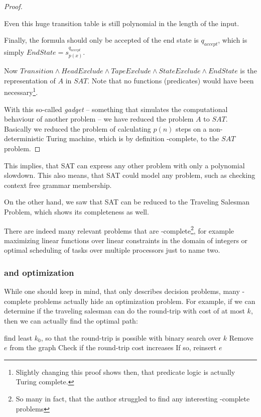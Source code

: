 \begin{proof}
\begin{itemize}
			Even this huge transition table is still polynomial in the length of the input.
	\end{itemize}
	
	Finally, the formula should only be accepted of the end state is $q_{accept}$, which is simply $EndState = s^{q_{accept}}_{p(x)}$.

	Now $Transition\wedge HeadExclude \wedge TapeExclude \wedge StateExclude \wedge EndState$ 
	is the representation of $A$ in $SAT$. Note that no functions (predicates) would have 
	been necessary\footnote{Slightly changing this proof shows then, that predicate 
	logic is actually Turing complete.}.

	With this so-called \emph{gadget} -- something that simulates the 
	computational behaviour of another problem -- we have reduced the problem $A$ 
	to $SAT$. Basically we reduced the problem of calculating $p(n)$ steps on a 
	non-deterministic Turing machine, which is by definition \NPTIME-complete, 
	to the $SAT$ problem.
\end{proof}
This implies, that SAT can express any other \NPTIME problem with only a 
polynomial slowdown. This also means, that SAT could model any \PTIME 
problem, such as checking context free grammar membership.

On the other hand, we saw that SAT can be reduced to the Traveling Salesman 
Problem, which shows its completeness as well.

There are indeed many relevant problems that are \NPTIME-complete\footnote{So 
many in fact, that the author struggled to find any interesting \PTIME-complete
problems}, for example maximizing linear functions over linear constraints in
the domain of integers or optimal scheduling of tasks over multiple processors
just to name two.

\subsubsection{\NPTIME and optimization}
\label{np-opti}
While one should keep in mind, that \NPTIME only
describes decision problems, many \NPTIME-complete
problems actually hide an optimization problem. For
example, if we can determine if the traveling
salesman can do the round-trip with cost of at most
$k$, then we can actually find the optimal path:

\begin{algorithmic}[1]
	\State find least $k_0$, so that the round-trip is possible with binary search over $k$
		\State Remove $e$ from the graph
		\State Check if the round-trip cost increases
		\State If so, reinsert $e$
	\EndFor
\end{algorithmic}

